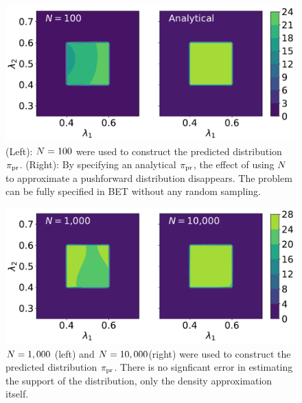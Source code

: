\begin{figure}[ht]
\begin{minipage}{.975\textwidth}
\includegraphics[width=\linewidth]{./examples/identity/samp/N100_N100-vs-Analytical_N100.pdf}
\end{minipage}
\caption{
(Left): $N=100$ were used to construct the predicted distribution $\operatorname*{\pi_{pr}}$.
(Right): By specifying an analytical $\operatorname*{\pi_{pr}}$, the effect of using $N$ to approximate a pushforward distribution disappears. The problem can be fully specified in BET without any random sampling.
}
\label{fig:ex:identity_sampling_exact}
\end{figure}

\begin{figure}[ht]
\begin{minipage}{.975\textwidth}
\includegraphics[width=\linewidth]{./examples/identity/samp/N1-000_N1000-vs-N10-000_N10000.pdf}
\end{minipage}
\caption{
$N=1,000$ (left) and $N=10,000$(right) were used to construct the predicted distribution $\operatorname*{\pi_{pr}}$.
There is no signficant error in estimating the support of the distribution, only the density approximation itself.
}
\label{fig:ex:identity_sampling_approx}
\end{figure}

